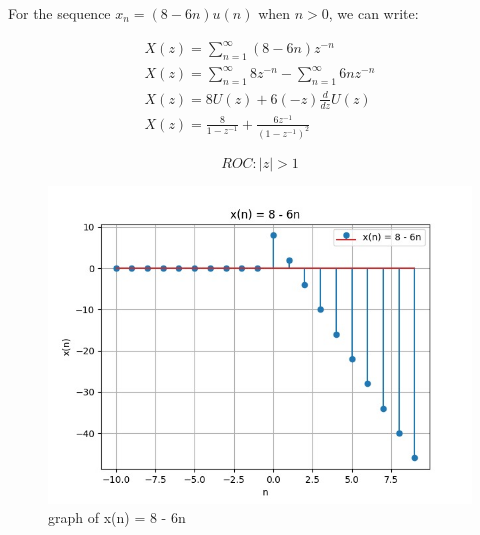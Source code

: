 \documentclass[journal,12pt,twocolumn]{IEEEtran}
\theoremstyle{remark}
\begin{document}
For the sequence $x_n = (8 - 6n)u(n)$ when $n > 0$, we can write:

    \begin{align}
        X(z) = \sum_{n=1}^{\infty} (8 - 6n)z^{-n}\\
        X(z) = \sum_{n=1}^{\infty} 8z^{-n} - \sum_{n=1}^{\infty} 6nz^{-n}\\
        X(z) = 8U(z) + 6(-z)\frac{d}{dz} U(z)\\
        X(z)=\frac{8}{1-z^{-1}}+\frac{6z^{-1}}{(1-z^{-1})^{2}}
    \end{align}

\[ ROC : |z| > 1\]

    \begin{figure}[h]
        \centering
        \includegraphics[width=1\linewidth]{figs/Figure_1.png}
        \caption{graph of x(n) = 8 - 6n}
        \label{8 - 6n dicrete function}
    \end{figure}

    
\end{document}

